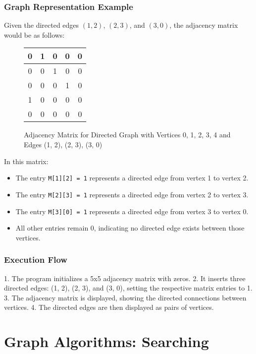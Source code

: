\documentclass{book}
\begin{document}
\subsection{Graph Representation Example}
Given the directed edges \((1, 2)\), \((2, 3)\), and \((3, 0)\), the adjacency matrix would be as follows:

\begin{figure}[h!]
    \centering
    \begin{tabular}{|c|c|c|c|c|}
    \hline
    0 & 1 & 0 & 0 & 0 \\
    \hline
    0 & 0 & 1 & 0 & 0 \\
    \hline
    0 & 0 & 0 & 1 & 0 \\
    \hline
    1 & 0 & 0 & 0 & 0 \\
    \hline
    0 & 0 & 0 & 0 & 0 \\
    \hline
    \end{tabular}
    \caption{Adjacency Matrix for Directed Graph with Vertices 0, 1, 2, 3, 4 and Edges (1, 2), (2, 3), (3, 0)}
\end{figure}

In this matrix:
\begin{itemize}
    \item The entry \texttt{M[1][2] = 1} represents a directed edge from vertex 1 to vertex 2.
    \item The entry \texttt{M[2][3] = 1} represents a directed edge from vertex 2 to vertex 3.
    \item The entry \texttt{M[3][0] = 1} represents a directed edge from vertex 3 to vertex 0.
    \item All other entries remain 0, indicating no directed edge exists between those vertices.
\end{itemize}

\subsection{Execution Flow}
1. The program initializes a 5x5 adjacency matrix with zeros.
2. It inserts three directed edges: (1, 2), (2, 3), and (3, 0), setting the respective matrix entries to 1.
3. The adjacency matrix is displayed, showing the directed connections between vertices.
4. The directed edges are then displayed as pairs of vertices.


\chapter{Graph Algorithms: Searching}
\end{document}

